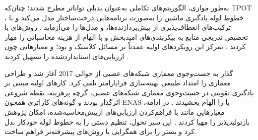 به‌طور موازی، الگوریتم‌های تکاملی به‌عنوان بدیلی تواناتر مطرح شدند؛ چنان‌که TPOT خطوط لوله یادگیری ماشین را به‌صورت برنامه‌هایی درخت‌ساختار مدل می‌کند و با ، ترکیب‌های انعطاف‌پذیری از پیش‌پردازنده‌ها،  و مدل‌ها را می‌آزماید \cite{pmlr-v64-olson_tpot_2016}. روش‌های  با تخصیص تدریجی منابع به پیکربندی‌های امیدبخش و با الهام از  هزینه محاسباتی را مهار کردند \cite{pmlr-v51-jamieson16, JMLR:v18:16-558}. تمرکز این رویکردهای اولیه عمدتاً بر مسائل کلاسیک  و  بود؛ و معیارهایی چون  ارزیابی‌های استانداردشده را تسهیل کردند \cite{bischl2021openmlbenchmarkingsuites}.

گذار به جست‌وجوی معماری شبکه‌های عصبی از حوالی 2017 آغاز شد و طراحی معماری را امتداد طبیعی بهینه‌سازی فراپارامتر تلقی کرد. کارهای اولیه مبتنی بر یادگیری تقویتی در جست‌وجوی معماری شبکه‌های عصبی، گرچه پرهزینه، نقطه شروعی اثرگذار بودند و گونه‌های کاراتری همچون ENAS با  را الهام بخشیدند \cite{zoph2017neural, pmlr-v80-pham18a}. در ادامه، معیارهایی مانند  با فراهم‌کردن ارزیابی‌های ازپیش‌محاسبه‌شده، امکان پژوهش بازتولیدپذیر را مهیا کردند \cite{pmlr-v97-ying19a}. این سیر تحول، تنظیم دستی را به خطوط لوله خودکار بدل کرد و بستر را برای همگرایی با روش‌های پیشرفته‌تر فراهم ساخت.